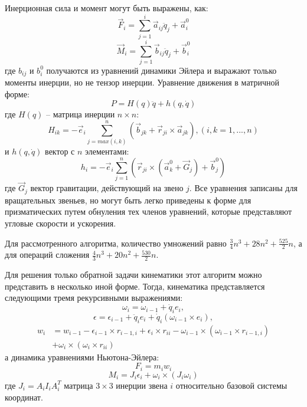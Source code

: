 Инерционная сила и момент могут быть выражены, как:
\begin{equation}
\vec F_i = \sum_{j=1}^{i}
\vec a_{ij} \ddot q_j + \vec a_i^0
\end{equation}
\begin{equation}
\vec M_i = \sum_{j=1}^{i}
\vec b_{ij} \ddot q_j + \vec b_i^0
\end{equation}
где $b_{ij}$ и $b_{i}^0$ получаются из уравнений динамики Эйлера и выражают только моменты инерции, но не тензор инерции. Уравнение движения в матричной форме:
\begin{equation}
P = H(q) \ddot q  + h(q, \dot q)
\end{equation}
где $H(q)$ -- матрица инерции $n \times n$:
\begin{equation}
H_{ik} = - \vec e_i \sum_{j=max(i,k)}^{n}
(\vec b_{jk} + \vec r_{ji} \times \vec a_{jk}), (i,k=1,...,n)
\end{equation}
и $h(q, \dot q)$ вектор с $n$ элементами:
\begin{equation}
h_i = - \vec e_i \sum_{j=1}^{n} (
\vec r_{ji} \times (\vec a_k^0 + \vec G_j) + \vec b_j^0
)
\end{equation} 
где $\vec G_j$ вектор гравитации, действующий на звено $j$. Все уравнения записаны для вращательных звеньев, но могут быть легко приведены к форме для призматических путем обнуления тех членов уравнений, которые представляют угловые скорости и ускорения.

Для рассмотренного алгоритма, количество умножений равно $\frac{3}{4} n^3 + 28 n^2 + \frac{525}{2} n$, а для операций сложения $\frac{4}{3} n^3 + 20 n^2 + \frac{530}{2} n$.

Для решения только обратной задачи кинематики этот алгоритм можно представить в несколько иной форме. Тогда, кинематика представляется следующими тремя рекурсивными выражениями:
\begin{equation}
\omega_i = \omega_{i-1} + \dot q_i e_i,
\end{equation}
\begin{equation}
\epsilon = \epsilon_{i-1} + \ddot q_i e_i + \dot q_i (\omega_{i-1} \times e_i),
\end{equation}
\begin{align*}
w_i &= w_{i-1} - \epsilon_{i-1} \times r_{i-1, i} + \epsilon_i \times r_{ii} - \omega_{i-1} \times (\omega_{i-1} \times r_{i-1,i})\\
&+ \omega_i \times (\omega_i \times r_{ii})
\end{align*}
а динамика уравнениями Ньютона-Эйлера:
\begin{equation}
F_i = m_i w_i
\end{equation}
\begin{equation}
M_i = J_i \epsilon_i + \omega_i \times (J_i \omega_i)
\end{equation}
где $J_i = A_i I_i A_i^T$ матрица $3 \times 3$ инерции звена $i$ относительно базовой системы координат.


